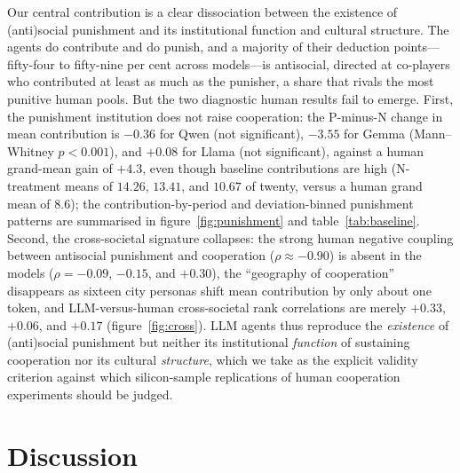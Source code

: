 \documentclass[openacc]{rsproca_new}
\begin{document}
Our central contribution is a clear dissociation between the existence of (anti)social punishment and its institutional function and cultural structure. The agents do contribute and do punish, and a majority of their deduction points---fifty-four to fifty-nine per cent across models---is antisocial, directed at co-players who contributed at least as much as the punisher, a share that rivals the most punitive human pools. But the two diagnostic human results fail to emerge. First, the punishment institution does not raise cooperation: the P-minus-N change in mean contribution is $-0.36$ for Qwen (not significant), $-3.55$ for Gemma (Mann--Whitney $p<0.001$), and $+0.08$ for Llama (not significant), against a human grand-mean gain of $+4.3$, even though baseline contributions are high (N-treatment means of $14.26$, $13.41$, and $10.67$ of twenty, versus a human grand mean of $8.6$); the contribution-by-period and deviation-binned punishment patterns are summarised in figure~\ref{fig:punishment} and table~\ref{tab:baseline}. Second, the cross-societal signature collapses: the strong human negative coupling between antisocial punishment and cooperation ($\rho \approx -0.90$) is absent in the models ($\rho = -0.09$, $-0.15$, and $+0.30$), the ``geography of cooperation'' disappears as sixteen city personas shift mean contribution by only about one token, and LLM-versus-human cross-societal rank correlations are merely $+0.33$, $+0.06$, and $+0.17$ (figure~\ref{fig:cross}). LLM agents thus reproduce the \emph{existence} of (anti)social punishment but neither its institutional \emph{function} of sustaining cooperation nor its cultural \emph{structure}, which we take as the explicit validity criterion against which silicon-sample replications of human cooperation experiments should be judged.



\section{Discussion}
\end{document}
